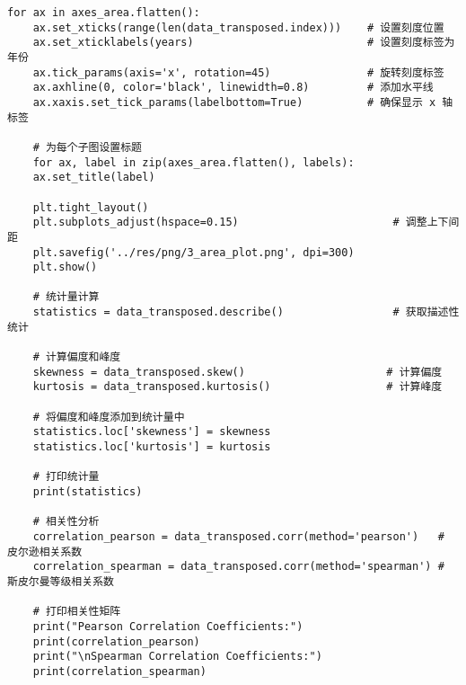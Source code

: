 \begin{lstlisting}[caption={问题一处理代码}]
	for ax in axes_area.flatten():
	ax.set_xticks(range(len(data_transposed.index)))    # 设置刻度位置
	ax.set_xticklabels(years)                           # 设置刻度标签为年份
	ax.tick_params(axis='x', rotation=45)               # 旋转刻度标签
	ax.axhline(0, color='black', linewidth=0.8)         # 添加水平线
	ax.xaxis.set_tick_params(labelbottom=True)          # 确保显示 x 轴标签
	
	# 为每个子图设置标题
	for ax, label in zip(axes_area.flatten(), labels):
	ax.set_title(label)
	
	plt.tight_layout()
	plt.subplots_adjust(hspace=0.15)                        # 调整上下间距
	plt.savefig('../res/png/3_area_plot.png', dpi=300)
	plt.show()
	
	# 统计量计算
	statistics = data_transposed.describe()                 # 获取描述性统计
	
	# 计算偏度和峰度
	skewness = data_transposed.skew()                      # 计算偏度
	kurtosis = data_transposed.kurtosis()                  # 计算峰度
	
	# 将偏度和峰度添加到统计量中
	statistics.loc['skewness'] = skewness
	statistics.loc['kurtosis'] = kurtosis
	
	# 打印统计量
	print(statistics)
	
	# 相关性分析
	correlation_pearson = data_transposed.corr(method='pearson')   # 皮尔逊相关系数
	correlation_spearman = data_transposed.corr(method='spearman') # 斯皮尔曼等级相关系数
	
	# 打印相关性矩阵
	print("Pearson Correlation Coefficients:")
	print(correlation_pearson)
	print("\nSpearman Correlation Coefficients:")
	print(correlation_spearman)
	
\end{lstlisting}


